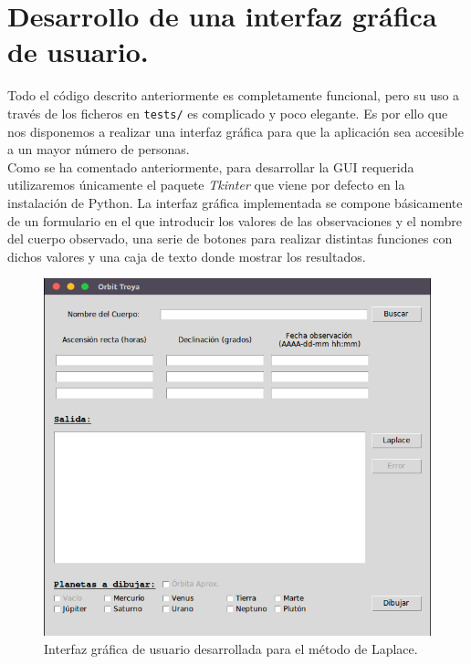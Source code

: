 \documentclass[11pt]{book}
\begin{document}
\section{Desarrollo de una interfaz gráfica de usuario.}
Todo el código descrito anteriormente es completamente funcional, pero su uso a través de los ficheros en \texttt{tests/} es complicado y poco elegante. Es por ello que nos disponemos a realizar una interfaz gráfica para que la aplicación sea accesible a un mayor número de personas.\\

Como se ha comentado anteriormente, para desarrollar la GUI requerida utilizaremos únicamente el paquete \textit{Tkinter} que viene por defecto en la instalación de Python. La interfaz gráfica implementada se compone básicamente de un formulario en el que introducir los valores de las observaciones y el nombre del cuerpo observado, una serie de botones para realizar distintas funciones con dichos valores y una caja de texto donde mostrar los resultados.

\begin{figure}[H]
\centering
\includegraphics[scale=0.5]{images/gui.png}
\caption{Interfaz gráfica de usuario desarrollada para el método de Laplace.}
\label{fig:gui}
\end{figure}
\end{document}
